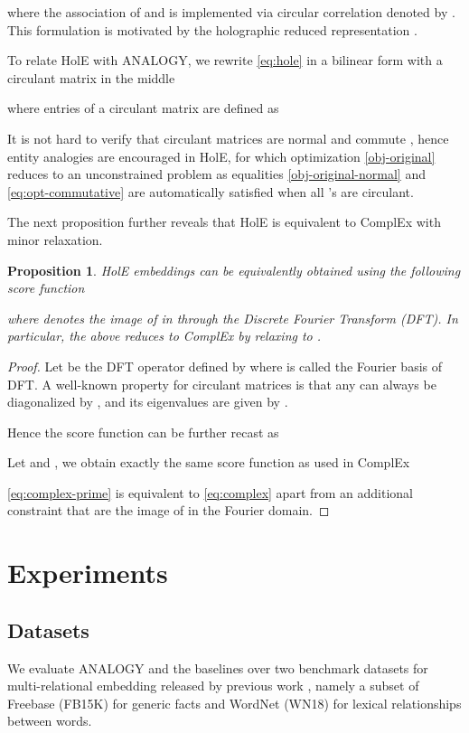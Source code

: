 \documentclass{article}
\newtheorem{proposition}{Proposition}[section]
\begin{document}
where the association of  and  is implemented via circular correlation denoted by .
This formulation is motivated by the holographic reduced representation \cite{plate2003holographic}.

To relate HolE with ANALOGY,
we rewrite \eqref{eq:hole} in a bilinear form with a circulant matrix  in the middle 

where entries of a circulant matrix are defined as

It is not hard to verify that circulant matrices are normal
and commute \cite{gray2006toeplitz},
hence entity analogies are encouraged in HolE,
for which optimization \eqref{obj-original} reduces to an unconstrained problem
as equalities \eqref{obj-original-normal} and \eqref{eq:opt-commutative} are automatically satisfied when all 's are circulant.

The next proposition
further reveals that HolE is equivalent to ComplEx with minor relaxation.
\begin{proposition}
    HolE embeddings can be equivalently obtained using the following score function 
    
    where  denotes the image of  in  through the Discrete Fourier Transform (DFT).
    In particular, the above reduces to ComplEx by relaxing  to .
\end{proposition}

\begin{proof}
    Let  be the DFT operator
    defined by  where  is called the Fourier basis of DFT.
    A well-known property for circulant matrices is that any  can always be diagonalized by ,
    and its eigenvalues are given by  \cite{gray2006toeplitz}.

    Hence the score function can be further recast as
    
    Let  and ,
    we obtain exactly the same score function as used in ComplEx
    
    \eqref{eq:complex-prime} is equivalent to \eqref{eq:complex}
    apart from an additional constraint that  are
    the image of  in the Fourier domain.
\end{proof}

 \section{Experiments}
\label{sec:experiments}

\subsection{Datasets}
We evaluate ANALOGY and the baselines over two benchmark datasets for multi-relational embedding released by previous work \cite{bordes2013translating},
namely a subset of Freebase (FB15K) for generic facts and WordNet (WN18) for lexical relationships between words.
\end{document}

